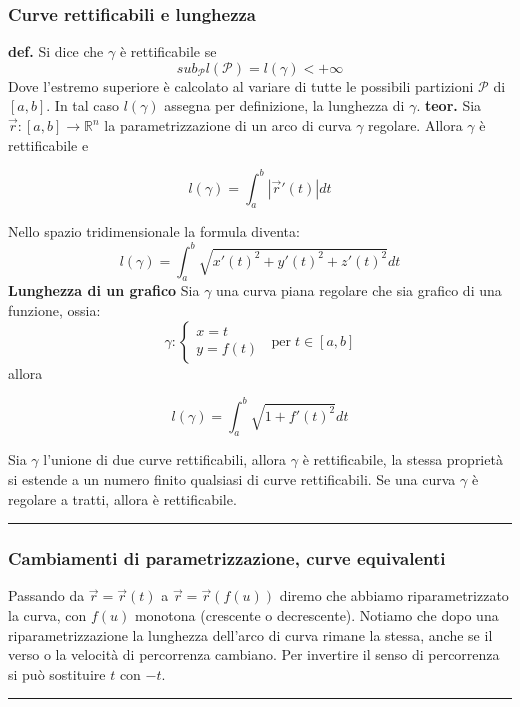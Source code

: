 \subsubsection{Curve rettificabili e lunghezza}
\textbf{def.} Si dice che $\gamma$ è rettificabile se 
\[
    sub_\mathcal{P} l(\mathcal{P}) = l(\gamma) < + \infty
\]
Dove l'estremo superiore è calcolato al variare di tutte le possibili partizioni $\mathcal{P}$ di $[a,b]$.\newline
In tal caso $l(\gamma)$ assegna per definizione, la lunghezza di $\gamma$.\newline
\newline
\textbf{teor.} Sia $\vec{r}:[a,b] \rightarrow \mathbb{R}^n$ la parametrizzazione di un arco di curva $\gamma$ regolare. Allora $\gamma$ è rettificabile e 
\begin{tcolorbox}
\[
    l(\gamma) = \int_{a}^{b}|\vec{r}'(t)| dt
\]
\end{tcolorbox}
Nello spazio tridimensionale la formula diventa:
\[
    l(\gamma)= \int_{a}^{b}\sqrt{x'(t)^2 + y'(t)^2 + z'(t)^2}dt
\]
\textbf{Lunghezza di un grafico}\newline
Sia $\gamma$ una curva piana regolare che sia grafico di una funzione, ossia:
\[
    \gamma : \begin{cases}
        x =t \\
        y= f(t)
    \end{cases} \;\; \text{per} \;t \in[a,b]
\]
allora
\begin{tcolorbox}
\[
    l(\gamma) = \int_{a}^{b}\sqrt{1+f'(t)^2}dt
\]
\end{tcolorbox}
Sia $\gamma$ l'unione di due curve rettificabili, allora $\gamma$ è rettificabile, la stessa proprietà si estende a un numero finito qualsiasi di curve rettificabili. \newline
\newline
Se una curva $\gamma$ è regolare a tratti, allora è rettificabile.\newline
\rule{\textwidth}{0,4pt}
\subsubsection{Cambiamenti di parametrizzazione, curve equivalenti}
Passando da $\vec{r} = \vec{r} (t)$ a $\vec{r} = \vec{r} (f(u))$ diremo che abbiamo riparametrizzato la curva, con $f(u)$ monotona (crescente o decrescente).\newline
Notiamo che dopo una riparametrizzazione la lunghezza dell'arco di curva rimane la stessa, anche se il verso o la velocità di percorrenza cambiano.\newline
Per invertire il senso di percorrenza si può sostituire $t$ con $-t$.\newline
\rule{\textwidth}{0,4pt}
